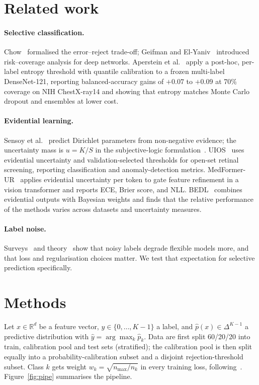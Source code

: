 \documentclass[conference]{IEEEtran}
\begin{document}
\section{Related work}
\paragraph{Selective classification.} Chow~\cite{chow1970reject} formalised the error--reject trade-off; Geifman and El-Yaniv~\cite{geifman2017selective} introduced risk--coverage analysis for deep networks. Aperstein et al.~\cite{aperstein2026selective} apply a post-hoc, per-label entropy threshold with quantile calibration to a frozen multi-label DenseNet-121, reporting balanced-accuracy gains of $+0.07$ to $+0.09$ at 70\% coverage on NIH ChestX-ray14 and showing that entropy matches Monte Carlo dropout and ensembles at lower cost.
\paragraph{Evidential learning.} Sensoy et al.~\cite{sensoy2018edl} predict Dirichlet parameters from non-negative evidence; the uncertainty mass is $u=K/S$ in the subjective-logic formulation~\cite{josang2016subjective,han2021tmc}. UIOS~\cite{wang2023uios} uses evidential uncertainty and validation-selected thresholds for open-set retinal screening, reporting classification and anomaly-detection metrics. MedFormer-UR~\cite{sibhai2026medformerur} applies evidential uncertainty per token to gate feature refinement in a vision transformer and reports ECE, Brier score, and NLL. BEDL~\cite{tchokponhoue2026bedl} combines evidential outputs with Bayesian weights and finds that the relative performance of the methods varies across datasets and uncertainty measures.
\paragraph{Label noise.} Surveys~\cite{frenay2014noise} and theory~\cite{natarajan2013noisy} show that noisy labels degrade flexible models more, and that loss and regularisation choices matter. We test that expectation for selective prediction specifically.

\section{Methods}
Let $x\in\mathbb{R}^d$ be a feature vector, $y\in\{0,\dots,K-1\}$ a label, and $\hat p(x)\in\Delta^{K-1}$ a predictive distribution with $\hat y=\arg\max_k \hat p_k$. Data are first split 60/20/20 into train, calibration pool and test sets (stratified); the calibration pool is then split equally into a probability-calibration subset and a disjoint rejection-threshold subset. Class $k$ gets weight $w_k=\sqrt{n_{\max}/n_k}$ in every training loss, following~\cite{aperstein2026selective}. Figure~\ref{fig:pipe} summarises the pipeline.
\end{document}
